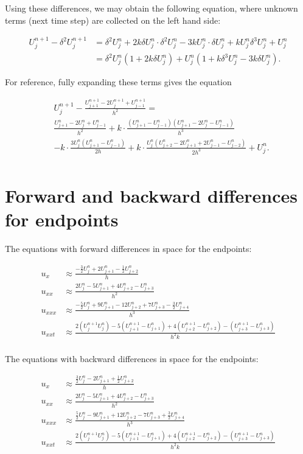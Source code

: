 \documentclass[fleqn]{article}
\begin{document}
Using these differences, we may obtain the following equation, where unknown terms (next time step) are collected on the left hand side:

\begin{align*}
U_j^{n+1} - \delta^2 U_j^{n+1} &= \delta^2 U_j^n + 2k\delta U_j^n \cdot \delta ^2U_j^n - 3 k U_j^n \cdot \delta U_j^n + k U_j^n \delta^3 U_j^n + U_j^n \\
&= \delta^2 U_j^n \left( 1 + 2k \delta U_j^n \right) + U_j^n \left(1 + k \delta^3 U_j^n - 3 k \delta U_j^n \right).
\end{align*}

For reference, fully expanding these terms gives the equation

\begin{align*}
&U_{j}^{n+1} - \frac{U_{j+1}^{n+1}-2U_{j}^{n+1}+U_{j-1}^{n+1}}{h^{2}} = \\
&\frac{U_{j+1}^n - 2U_j^n + U_{j-1}^n}{h^2} +k \cdot \frac{\left(U_{j+1}^n - U_{j-1}^n\right)\left(U_{j+1}^n-2U_{j}^n-U_{j-1}^n\right)}{h^{3}}\\
&-k \cdot \frac{3U_{j}^n\left(U_{j+1}^n-U_{j-1}^n\right)}{2h} +k \cdot \frac{U_{j}^n\left(U_{j+2}^n-2U_{j+1}^n+2U_{j-1}^n-U_{j-2}^n\right)}{2h^{3}} + U_{j}^n.\\
\end{align*}


\section*{Forward and backward differences for endpoints}
The equations with forward differences in space for the endpoints:

\begin{align*}
u_x &\approx \frac{-\frac{3}{2}U_j^n+2U_{j+1}^n-\frac{1}{2}U_{j+2}^n}{h} \\
u_{xx} &\approx \frac{2U_j^n-5U_{j+1}^n+4U_{j+2}^n-U_{j+3}^n}{h^{2}} \\
u_{xxx} &\approx \frac{-\frac{5}{2}U_j^n+9U_{j+1}^n-12U_{j+2}^n+7U_{j+3}^n-\frac{3}{2}U_{j+4}^n}{h^{3}} \\
u_{xxt} &\approx \frac{2\left(U_j^{n+1}U_j^n\right)-5\left(U_{j+1}^{n+1}-U_{j+1}^{n}\right)+4\left(U_{j+2}^{n+1}-U_{j+2}^n\right)-\left(U_{j+3}^{n+1}-U_{j+3}^n\right)}{h^{2}k} \\
\end{align*}

The equations with backward differences in space for the endpoints:

\begin{align*}
u_x &\approx \frac{\frac{3}{2}U_j^n-2U_{j+1}^n+\frac{1}{2}U_{j+2}^n}{h} \\
u_{xx} &\approx \frac{2U_j^n-5U_{j+1}^n+4U_{j+2}^n-U_{j+3}^n}{h^{2}} \\
u_{xxx} &\approx \frac{\frac{5}{2}U_j^n-9U_{j+1}^n+12U_{j+2}^n-7U_{j+3}^n+\frac{3}{2}U_{j+4}^n}{h^{3}} \\
u_{xxt} &\approx \frac{2\left(U_j^{n+1}U_j^n\right)-5\left(U_{j+1}^{n+1}-U_{j+1}^{n}\right)+4\left(U_{j+2}^{n+1}-U_{j+2}^n\right)-\left(U_{j+3}^{n+1}-U_{j+3}^n\right)}{h^{2}k} \\
\end{align*}
\end{document}
